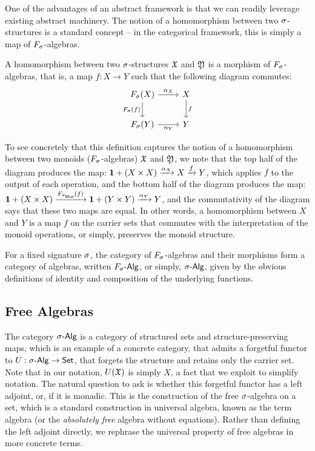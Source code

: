 One of the advantages of an abstract framework is that we can readily leverage existing abstract machinery.
%
The notion of a homomorphism between two $\sigma$-structures is a standard concept --
in the categorical framework, this is simply a map of $\Sig$-algebras.

\begin{definition}[Homomorphism]
    A homomorphism between two $\sigma$-structures $\mathfrak{X}$ and $\mathfrak{Y}$ is a morphism of $\Sig$-algebras,
    that is, a map $f : X \to Y$ such that the following diagram commutes:
    \[
        \begin{tikzcd}
            \Sig(X) \arrow[r, "\alpha_{X}"] \arrow[d, "\Sig(f)"']
            & X \arrow[d, "f"] \\
            \Sig(Y) \arrow[r, "\alpha_{Y}"']
            & Y
        \end{tikzcd}
    \]
\end{definition}

\begin{example}
    To see concretely that this definition captures the notion of a homomorphism between two monoids ($\Sig$-algebras)
    \(\mathfrak{X}\) and \(\mathfrak{Y}\), we note that the top half of the diagram produces the map:
    \({{\mathbf{1}} + (X \times X) \xrightarrow{\alpha_{X}} X \xrightarrow{f} Y}\), which applies \(f\) to the output of each operation,
    and the bottom half of the diagram produces the map:
    \({\unitt + (X \times X) \xto{\SigMon(f)} \unitt + (Y \times Y) \xto{\alpha_{Y}} Y}\),
    and the commutativity of the diagram says that these two maps are equal.
    In other words, a homomorphism between $X$ and $Y$ is a map $f$ on the carrier sets that commutes with the
    interpretation of the monoid operations, or simply, preserves the monoid structure.
\end{example}

For a fixed signature $\sigma$,
the category of $\Sig$-algebras and their morphisms form a category of algebras,
written $\SigAlg$, or simply, $\sigAlg$,
given by the obvious definitions of identity and composition of the underlying functions.

\subsection{Free Algebras}
\label{sec:universal-algebra:free-algebras}

The category $\sigAlg$ is a category of structured sets and structure-preserving maps,
which is an example of a concrete category, that admits a forgetful functor to $U : \sigAlg \to \Set$,
that forgets the structure and retains only the carrier set.
%
Note that in our notation, $U(\mathfrak{X})$ is simply $X$, a fact that we exploit to simplify notation.
%
The natural question to ask is whether this forgetful functor has a left adjoint, or, if it is monadic.
%
This is the construction of the free $\sigma$-algebra on a set, which is a standard construction in universal algebra,
known as the term algebra (or the \emph{absolutely free} algebra without equations).
%
Rather than defining the left adjoint directly, we rephrase the universal property of free algebras in more concrete
terms.

